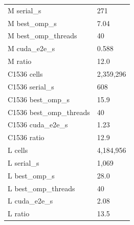 \begin{tabular}{ll}
M serial\_s & 271 \\
M best\_omp\_s & 7.04 \\
M best\_omp\_threads & 40 \\
M cuda\_e2e\_s & 0.588 \\
M ratio & 12.0 \\
C1536 cells & 2,359,296 \\
C1536 serial\_s & 608 \\
C1536 best\_omp\_s & 15.9 \\
C1536 best\_omp\_threads & 40 \\
C1536 cuda\_e2e\_s & 1.23 \\
C1536 ratio & 12.9 \\
L cells & 4,184,956 \\
L serial\_s & 1,069 \\
L best\_omp\_s & 28.0 \\
L best\_omp\_threads & 40 \\
L cuda\_e2e\_s & 2.08 \\
L ratio & 13.5 \\
\end{tabular}
